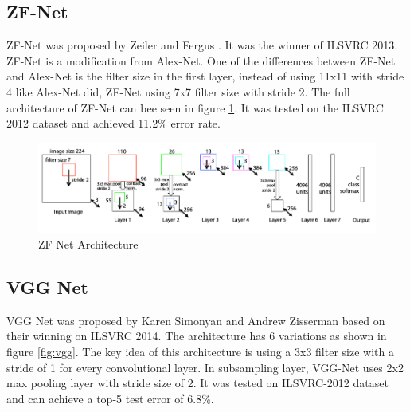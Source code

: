 \subsection{ZF-Net}
ZF-Net was proposed by Zeiler and Fergus \cite{zeiler2014visualizing}. It was the winner of ILSVRC 2013. ZF-Net is a modification from Alex-Net. One of the differences between ZF-Net and Alex-Net is the filter size in the first layer, instead of using 11x11 with stride 4 like Alex-Net did, ZF-Net using 7x7 filter size with stride 2. The full architecture of ZF-Net can bee seen in figure \ref{fig:zf}. It was tested on the ILSVRC 2012 dataset and achieved 11.2\% error rate.

\begin{figure}[h]
	\includegraphics[scale=0.5]{figures/zfnet}
	\centering
	\caption{ZF Net Architecture \cite{zeiler2014visualizing}}
	\label{fig:zf}
\end{figure}


\subsection{VGG Net}
VGG Net was proposed by Karen Simonyan and Andrew Zisserman \cite{simonyan2014very} based on their winning on ILSVRC 2014. The architecture has 6 variations as shown in figure \ref{fig:vgg}. The key idea of this architecture is using a 3x3 filter size with a stride of 1 for every convolutional layer. In subsampling layer, VGG-Net uses 2x2 max pooling layer with stride size of 2. It was tested on ILSVRC-2012 dataset and can achieve a top-5 test error of 6.8\%.

